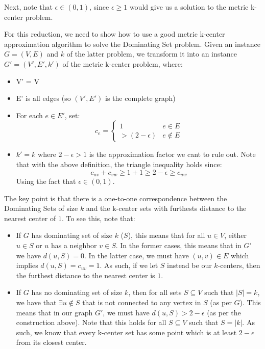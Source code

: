 \documentclass[12pt]{exam}
\begin{document}
\begin{questions}
\begin{solution}
\begin{enumerate}[label=(\alph*)]
      Next, note that $\epsilon \in (0, 1)$, since $\epsilon \geq 1$ would give us a solution to the metric k-center problem.

      For this reduction, we need to show how to use a good metric k-center approximation algorithm to solve the Dominating Set problem. Given an instance $G = (V,E)$ and $k$ of the latter problem, we transform it into an instance $G' = (V', E', k')$ of the metric k-center problem, where:
      \begin{itemize}
        \item V' = V
        \item E' is all edges (so $(V', E')$ is the complete graph)
        \item For each $e \in E'$, set:
          \[
            c_e = \begin{cases}
              1 & e \in E \\
              >(2-\epsilon) & e \notin E
            \end{cases}
          \]
        \item $k' = k$
          where $2 - \epsilon > 1$ is the approximation factor we cant to rule out. Note that with the above definition, the triangle inequality holds since:
          \[
            c_{uv} + c_{vw} \geq 1 + 1 \geq 2 - \epsilon \geq c_{uw}
          \]
          Using the fact that $\epsilon \in (0, 1)$.
      \end{itemize}
      The key point is that there is a one-to-one correspondence between the Dominating Sets of size $k$ and the k-center sets with furthests distance to the nearest center of $1$. To see this, note that:
      \begin{itemize}
        \item If $G$ has dominating set of size $k$ ($S$), this means that for all $u \in V$, either $u \in S$ or $u$ has a neighbor $v \in S$. In the former cases, this means that in $G'$ we have $d(u,S) = 0$. In the latter case, we must have $(u,v) \in E$ which implies $d(u, S) = c_{uv} = 1$. As such, if we let $S$ instead be our $k$-centers, then the furthest distance to the nearest center is $1$.
        \item If $G$ has no dominating set of size $k$, then for all sets $S \subseteq V$ such that $|S| = k$, we have that $\exists u \notin S$ that is not connected to any vertex in $S$ (as per $G$). This means that in our graph $G'$, we must have $d(u, S) > 2 - \epsilon$ (as per the construction above). Note that this holds for all $S \subseteq V$ such that $S = |k|$. As such, we know that every k-center set has some point which is at least $2 - \epsilon$ from its closest center.
      \end{itemize}


\end{enumerate}
\end{solution}
\end{questions}
\end{document}
